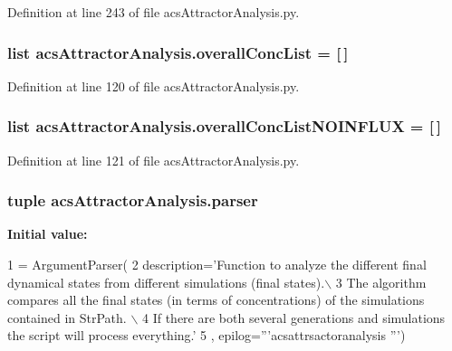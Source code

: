 Definition at line 243 of file acs\-Attractor\-Analysis.\-py.

\hypertarget{a00091_aca1d14f4dbff06c02b0e3e362c7ffe14}{
\subsubsection[{overall\-Conc\-List}]{\setlength{\rightskip}{0pt plus 5cm}list acs\-Attractor\-Analysis.\-overall\-Conc\-List = \mbox{[}$\,$\mbox{]}}}\label{a00091_aca1d14f4dbff06c02b0e3e362c7ffe14}


Definition at line 120 of file acs\-Attractor\-Analysis.\-py.

\hypertarget{a00091_a62444c9b0d66deb07c2e1091695e7561}{
\subsubsection[{overall\-Conc\-List\-N\-O\-I\-N\-F\-L\-U\-X}]{\setlength{\rightskip}{0pt plus 5cm}list acs\-Attractor\-Analysis.\-overall\-Conc\-List\-N\-O\-I\-N\-F\-L\-U\-X = \mbox{[}$\,$\mbox{]}}}\label{a00091_a62444c9b0d66deb07c2e1091695e7561}


Definition at line 121 of file acs\-Attractor\-Analysis.\-py.

\hypertarget{a00091_ab2b01a2d0224ace0cd720a6d807afd0b}{
\subsubsection[{parser}]{\setlength{\rightskip}{0pt plus 5cm}tuple acs\-Attractor\-Analysis.\-parser}}\label{a00091_ab2b01a2d0224ace0cd720a6d807afd0b}
{\bfseries Initial value\-:}
\begin{DoxyCode}
1 = ArgumentParser(
2                                 description=\textcolor{stringliteral}{'Function to analyze the different final dynamical states from
       different simulations (final states).\(\backslash\)}
3 \textcolor{stringliteral}{                                                        The algorithm compares all the final states (in
       terms of concentrations) of the simulations contained in StrPath. \(\backslash\)}
4 \textcolor{stringliteral}{                                                        If there are both several generations and
       simulations the script will process everything.'}
5                                 , epilog=\textcolor{stringliteral}{'''acsattrsactoranalysis '''})
\end{DoxyCode}


